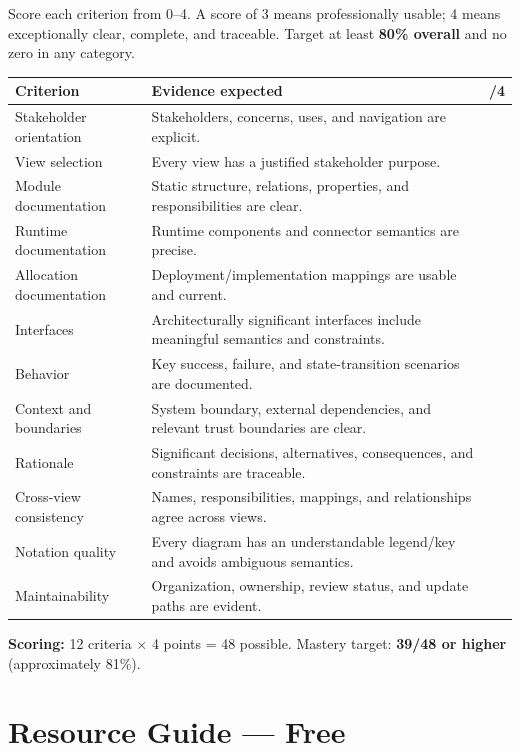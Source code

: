 \documentclass[10pt,letterpaper]{article}
\begin{document}
Score each criterion from 0--4. A score of 3 means professionally usable; 4 means exceptionally clear, complete, and traceable. Target at least \textbf{80\% overall} and no zero in any category.

\begin{longtable}{@{}P{0.30\textwidth}P{0.58\textwidth}P{0.06\textwidth}@{}}
\toprule
{}\color{white}\textbf{Criterion} & \color{white}\textbf{Evidence expected} & \color{white}\textbf{/4} \\
\midrule
\endhead
Stakeholder orientation & Stakeholders, concerns, uses, and navigation are explicit. & \\
View selection & Every view has a justified stakeholder purpose. & \\
Module documentation & Static structure, relations, properties, and responsibilities are clear. & \\
Runtime documentation & Runtime components and connector semantics are precise. & \\
Allocation documentation & Deployment/implementation mappings are usable and current. & \\
Interfaces & Architecturally significant interfaces include meaningful semantics and constraints. & \\
Behavior & Key success, failure, and state-transition scenarios are documented. & \\
Context and boundaries & System boundary, external dependencies, and relevant trust boundaries are clear. & \\
Rationale & Significant decisions, alternatives, consequences, and constraints are traceable. & \\
Cross-view consistency & Names, responsibilities, mappings, and relationships agree across views. & \\
Notation quality & Every diagram has an understandable legend/key and avoids ambiguous semantics. & \\
Maintainability & Organization, ownership, review status, and update paths are evident. & \\
\bottomrule
\end{longtable}

\textbf{Scoring:} 12 criteria $\times$ 4 points = 48 possible. Mastery target: \textbf{39/48 or higher} (approximately 81\%).

\section{Resource Guide --- Free}
\end{document}
